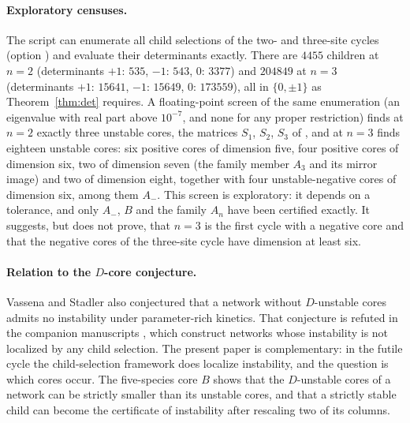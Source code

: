 \documentclass[11pt,a4paper]{article}
\theoremstyle{plain}
\theoremstyle{definition}
\theoremstyle{remark}
\newcommand{\Aminus}{A_{-}}
\begin{document}
\paragraph{Exploratory censuses.}
The script  can enumerate all child selections of the two- and three-site cycles (option ) and evaluate their determinants exactly. There are $4455$ children at $n=2$ (determinants $+1$: $535$, $-1$: $543$, $0$: $3377$) and $204849$ at $n=3$ (determinants $+1$: $15641$, $-1$: $15649$, $0$: $173559$), all in $\{0,\pm1\}$ as Theorem~\ref{thm:det} requires. A floating-point screen of the same enumeration (an eigenvalue with real part above $10^{-7}$, and none for any proper restriction) finds at $n=2$ exactly three unstable cores, the matrices $S_1$, $S_2$, $S_3$ of \citep{VassenaStadler2024}, and at $n=3$ finds eighteen unstable cores: six positive cores of dimension five, four positive cores of dimension six, two of dimension seven (the family member $A_3$ and its mirror image) and two of dimension eight, together with four unstable-negative cores of dimension six, among them $\Aminus$. This screen is exploratory: it depends on a tolerance, and only $\Aminus$, $B$ and the family $A_n$ have been certified exactly. It suggests, but does not prove, that $n=3$ is the first cycle with a negative core and that the negative cores of the three-site cycle have dimension at least six.

\paragraph{Relation to the $D$-core conjecture.}
Vassena and Stadler also conjectured that a network without $D$-unstable cores admits no instability under parameter-rich kinetics. That conjecture is refuted in the companion manuscripts \citep{ParameterRich2026,KineticOrder2026}, which construct networks whose instability is not localized by any child selection. The present paper is complementary: in the futile cycle the child-selection framework does localize instability, and the question is which cores occur. The five-species core $B$ shows that the $D$-unstable cores of a network can be strictly smaller than its unstable cores, and that a strictly stable child can become the certificate of instability after rescaling two of its columns.
\end{document}
